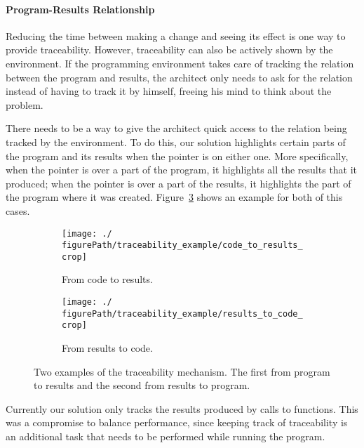 \paragraph{Program-Results Relationship}
Reducing the time between making a change and seeing its effect is one way to provide traceability.
However, traceability can also be actively shown by the environment.
If the programming environment takes care of tracking the relation between the program and results, the architect only needs to ask for the relation instead of having to track it by himself, freeing his mind to think about the problem.

There needs to be a way to give the architect quick access to the relation being tracked by the environment.
To do this, our solution highlights certain parts of the program and  its results when the pointer is on either one.
More specifically, when the pointer is over a part of the program, it highlights all the results that it produced;
when the pointer is over a part of the results, it highlights the part of the program where it was created.
Figure~\ref{fig:trace:example} shows an example for both of this cases.

\begin{figure}
  \centering
  \begin{subfigure}[b]{1.0\linewidth}
    \texttt{[image: ./\\figurePath/traceability\_example/code\_to\_results\_crop]}
    \caption{From code to results.}
    \label{sub:code:to:results}
  \end{subfigure}

  \begin{subfigure}[b]{1.0\linewidth}
    \texttt{[image: ./\\figurePath/traceability\_example/results\_to\_code\_crop]}
    \caption{From results to code.}
    \label{sub:results:to:code}
  \end{subfigure}
  \caption{Two examples of the traceability mechanism. The first from program to results and the second from results to program.}
  \label{fig:trace:example}
\end{figure}

Currently our solution only tracks the results produced by calls to functions.
This was a compromise to balance performance, since keeping track of traceability is an additional task that needs to be performed while running the program.

